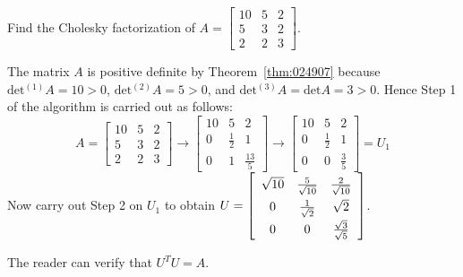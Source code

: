 \documentclass{ximera}
\begin{document}
\begin{example}\label{exa:024959}
Find the Cholesky factorization of $A = \left[ \begin{array}{rrr}
10 & 5 & 2 \\
5 & 3 & 2 \\
2 & 2 & 3
\end{array}\right]$.


\begin{explanation}
  The matrix $A$ is positive definite by Theorem~\ref{thm:024907} because $\mbox{det}{^{(1)}A} = 10 > 0$, $\mbox{det}{^{(2)}A} = 5 > 0$, and $\mbox{det}{^{(3)}A} = \mbox{det} A = 3 > 0$. Hence Step 1 of the algorithm is carried out as follows:
\begin{equation*}
A = \left[ \begin{array}{rrr}
10 & 5 & 2 \\
5 & 3 & 2 \\
2 & 2 & 3
\end{array}\right] \rightarrow \left[ \begin{array}{rrc}
10 & 5 & 2 \\
0 & \frac{1}{2} & 1 \\
0 & 1 & \frac{13}{5}
\end{array}\right] \rightarrow \left[ \begin{array}{rrr}
10 & 5 & 2 \\
0 & \frac{1}{2} & 1 \\
0 & 0 & \frac{3}{5}
\end{array}\right] = U_{1}
\end{equation*}
Now carry out Step 2 on $U_{1}$ to obtain $U = \left[ \def\arraystretch{1.5}\begin{array}{ccc}
\sqrt{10} & \frac{5}{\sqrt{10}} & \frac{2}{\sqrt{10}} \\
0 & \frac{1}{\sqrt{2}} & \sqrt{2} \\
0 & 0 & \frac{\sqrt{3}}{\sqrt{5}}
\end{array}\right]$.

The reader can verify that $U^{T}U = A$.
\end{explanation}
\end{example}
\end{document}
